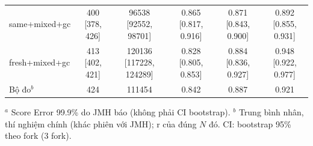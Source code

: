 \begin{tabular}{lccccc}
same+mixed+gc & \makecell{400 \\ {[378, 426]}} & \makecell{96538 \\ {[92552, 98701]}} & \makecell{0.865 \\ {[0.817, 0.916]}} & \makecell{0.871 \\ {[0.843, 0.900]}} & \makecell{0.892 \\ {[0.855, 0.931]}} \\
fresh+mixed+gc & \makecell{413 \\ {[402, 421]}} & \makecell{120136 \\ {[117228, 124289]}} & \makecell{0.828 \\ {[0.805, 0.853]}} & \makecell{0.884 \\ {[0.836, 0.927]}} & \makecell{0.948 \\ {[0.922, 0.977]}} \\
\midrule
Bộ đo$^{b}$ & 424 & 111454 & 0.842 & 0.887 & 0.921 \\
\bottomrule
\end{tabular}
\par\smallskip\raggedright\footnotesize $^{a}$ Score Error 99.9\% do JMH báo (không phải CI bootstrap). $^{b}$ Trung bình nhân, thí nghiệm chính (khác phiên với JMH); r của đúng $N$ đó. CI: bootstrap 95\% theo fork (3 fork).

